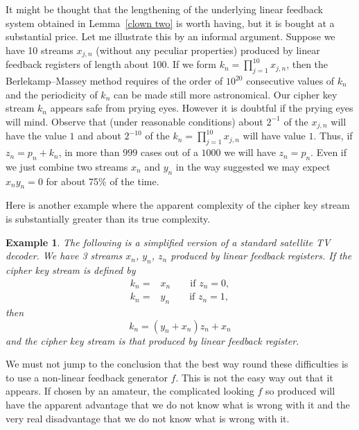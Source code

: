 \documentclass[12pt,a4paper]{article}
\theoremstyle{plain}
\newtheorem{example}[theorem]{Example}
\theoremstyle{definition}
\begin{document}
    It might be thought that the lengthening
    of the underlying linear feedback system
    obtained in Lemma~\ref{clown two} is worth
    having, but it is bought at a substantial
    price. Let me illustrate this by an informal
    argument. Suppose we have 10
    streams  $x_{j,n}$ (without any peculiar
    properties) produced by
    linear feedback registers of length about
    100. If we form
    $k_{n}=\prod_{j=1}^{10}x_{j,n}$, then
    the Berlekamp--Massey method requires
    of the order of $10^{20}$ consecutive
    values of $k_{n}$ and the periodicity
    of $k_{n}$ can be made still more
    astronomical. Our cipher key stream
    $k_{n}$ appears safe from prying eyes.
    However it is doubtful if the prying
    eyes will mind. Observe that (under reasonable
    conditions) about $2^{-1}$ of the $x_{j,n}$
    will have the value $1$ and about
    $2^{-10}$ of the $k_{n}=\prod_{j=1}^{10}x_{j,n}$
    will have value $1$. Thus, if
    $z_{n}=p_{n}+k_{n}$, in more than
    $999$ cases out of a $1000$ we will have
    $z_{n}=p_{n}$. Even if we just combine
    two streams $x_{n}$ and $y_{n}$ in the
    way suggested we may expect $x_{n}y_{n}=0$
    for about 75\% of the time.


    Here is another example where the apparent
    complexity of the cipher key stream
    is substantially greater than its true
    complexity.
    \begin{example}
        The following is a simplified
        version of a standard satellite TV decoder.
        We have 3 streams  $x_{n}$, $y_{n}$, $z_{n}$
        produced by linear feedback registers.
        If the cipher key stream is defined by
        \begin{align*}
            k_{n}=&x_{n}\qquad\text{if $z_{n}=0$},\\
            k_{n}=&y_{n}\qquad\text{if $z_{n}=1$},
        \end{align*}
        then
        \[k_{n}=(y_{n}+x_{n})z_{n}+x_{n}\]
        and the cipher key stream is that produced
        by linear feedback register.
    \end{example}

    We must not jump to the conclusion
    that the best way round
    these difficulties is to use a non-linear
    feedback generator $f$. This is not the
    easy way out that it appears. If chosen
    by an amateur, the complicated looking
    $f$ so produced will have the apparent
    advantage that we do not know what is
    wrong with it and the very real disadvantage
    that we do not know what is
    wrong with it.
\end{document}
